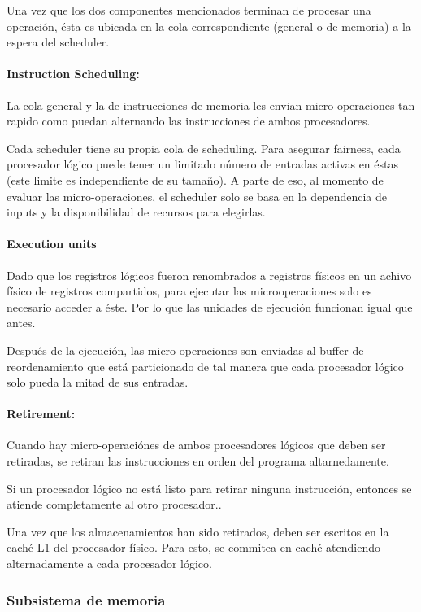Una vez que los dos componentes mencionados terminan de procesar una operación, ésta es ubicada en la cola correspondiente (general o de memoria) a la espera del scheduler.

\paragraph{Instruction Scheduling:} 
La cola general y la de instrucciones de memoria les envian micro-operaciones tan rapido como puedan alternando las instrucciones de ambos procesadores.

Cada scheduler tiene su propia cola de scheduling. Para  asegurar fairness, cada procesador lógico puede tener un limitado número de entradas activas en éstas (este limite es independiente de su tamaño). A parte de eso, al momento de evaluar las micro-operaciones, el scheduler solo se basa en la dependencia de inputs y la disponibilidad de recursos para elegirlas.

\paragraph{Execution units}
Dado que los registros lógicos fueron renombrados a registros físicos en un achivo físico de registros compartidos, para ejecutar las microoperaciones solo es necesario acceder a éste. Por lo que las unidades de ejecución funcionan igual que antes.

Después de la ejecución, las micro-operaciones son enviadas al buffer de reordenamiento que está particionado de tal manera que cada procesador lógico solo pueda la mitad de sus entradas.

\paragraph{Retirement:} Cuando hay micro-operaciónes de ambos procesadores lógicos que deben ser retiradas, se  retiran las instrucciones en orden del programa altarnedamente.

Si un procesador lógico no está listo para retirar ninguna instrucción, entonces se atiende completamente al otro procesador..

Una vez que los almacenamientos han sido retirados, deben ser escritos en la caché L1 del procesador físico. Para esto, se commitea en caché atendiendo alternadamente a cada procesador lógico.

\subsubsection{Subsistema de memoria}

